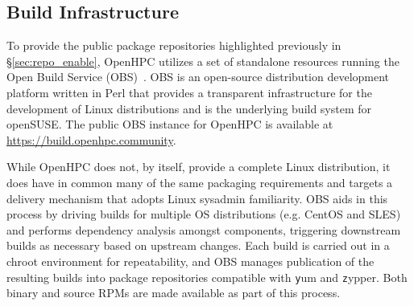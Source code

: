\documentclass{sig-alternate-05-2015}
\begin{document}




\subsection{Build Infrastructure} \label{sec:build_infra}

To provide the public package repositories highlighted previously in
\S\ref{sec:repo_enable}, OpenHPC utilizes a set of standalone resources
running the Open Build Service (OBS)~\cite{OBS_url}.  OBS is an open-source
distribution development platform written in Perl that provides a transparent
infrastructure for the development of Linux distributions and is the underlying
build system for openSUSE.  The public OBS instance for OpenHPC is available at
\url{https://build.openhpc.community}.

While OpenHPC does not, by itself, provide a complete Linux distribution, it
does have in common many of the same packaging requirements and targets a
delivery mechanism that adopts Linux sysadmin familiarity.  OBS aids in this
process by driving builds for multiple OS distributions (e.g. CentOS and SLES)
and performs dependency analysis amongst components, triggering downstream
builds as necessary based on upstream changes. Each build is carried out in a
chroot environment for repeatability, and OBS manages publication of the resulting
builds into package repositories compatible with {\texttt yum} and {\texttt
  zypper}. Both binary and source RPMs are made available as part of this process.
\end{document}
